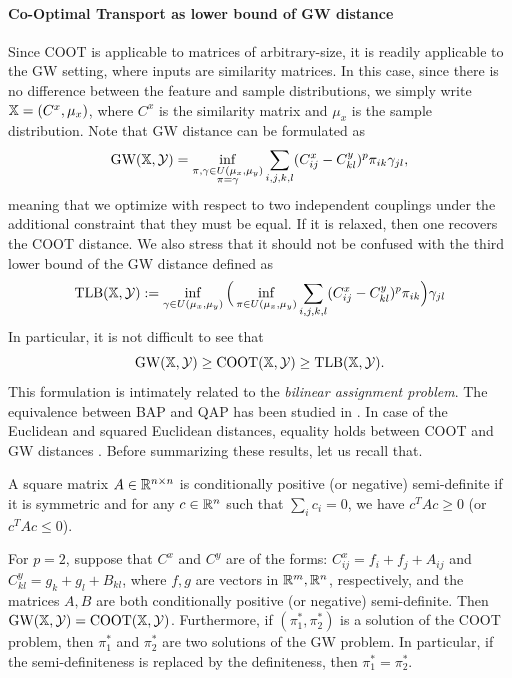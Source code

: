 \paragraph{Co-Optimal Transport as lower bound of GW distance} \label{subsec:GWLB}
Since COOT is applicable to matrices of arbitrary-size, it is readily applicable to the GW setting,
where inputs are similarity matrices. In this case, since there is no difference between
the feature and sample distributions, we simply write $\mathbb X = (C^x, \mu_x)$,
where $C^x$ is the similarity matrix and $\mu_x$ is the sample distribution.
Note that GW distance can be formulated as
\begin{align}
  \text{GW}(\mathbb X, \mathcal Y) =
  \inf_{\substack{\pi, \gamma \in U(\mu_x, \mu_y) \\ \pi = \gamma }}
  \sum_{i,j,k,l} (C^x_{ij} - C^y_{kl})^p \pi_{ik} \gamma_{jl},
\end{align}
meaning that we optimize with respect to two independent couplings
under the additional constraint that they must be equal. If it is relaxed, then
one recovers the COOT distance. We also stress that it should not
be confused with the third lower bound of the GW distance \citep{Memoli07,Memoli11} defined as
\begin{equation}
  \text{TLB}(\mathbb X, \mathcal Y) :=
  \inf_{\gamma \in U(\mu_x, \mu_y)}
  \Big( \inf_{\pi \in U(\mu_x, \mu_y)} \sum_{i,j,k,l} (C^x_{ij} - C^y_{kl})^p \pi_{ik} \Big)
  \gamma_{jl}
\end{equation}
In particular, it is not difficult to see that
\begin{equation}
  \label{gw_tlb_COOT}
  \text{GW}(\mathbb X, \mathcal Y) \geq \text{COOT}(\mathbb X, \mathcal Y)
  \geq \text{TLB}(\mathbb X, \mathcal Y).
\end{equation}
This formulation is intimately related to the \textit{bilinear assignment problem}.
The equivalence between BAP and QAP has been studied in \citep{Konno76}.
In case of the Euclidean and squared Euclidean distances, equality holds between
COOT and GW distances \citep{Sejourne20,Redko20}. Before summarizing these results,
let us recall that.
\begin{definition}
   A square matrix $A \in \mathbb R^{n \times n}$ is
  conditionally positive (or negative) semi-definite
  if it is symmetric and for any $c \in \mathbb R^n$ such that $\sum_i c_i = 0$, we have
  $c^T A c \geq 0$ (or $c^T A c \leq 0$).
\end{definition}
\begin{proposition}
  \label{prop:coot_gw_equiv}
  For $p=2$, suppose that $C^x$ and $C^y$ are of the forms:
  $C^x_{ij} = f_i + f_j + A_{ij}$ and $C^y_{kl} = g_k + g_l + B_{kl}$,
  where $f, g$ are vectors in $\mathbb R^m, \mathbb R^n$, respectively,
  and the matrices $A, B$ are both conditionally positive (or negative) semi-definite.
  Then $\text{GW}(\mathbb X, \mathcal Y) = \text{COOT}(\mathbb X, \mathcal Y)$.
  Furthermore, if $(\pi_1^*, \pi_2^*)$ is a solution of the COOT problem, then $\pi_1^*$ and $\pi_2^*$
  are two solutions of the GW problem. In particular,
  if the semi-definiteness is replaced by the definiteness, then $\pi_1^* = \pi_2^*$.
\end{proposition}
